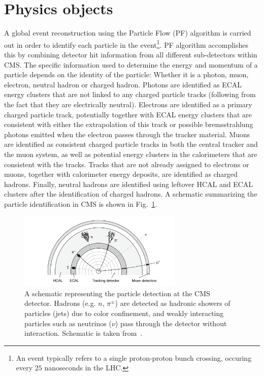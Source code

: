 \section{Physics objects} \label{sec:objects}

\newcommand{\GeV}{\ensuremath{GeV}\xspace}
\newcommand{\pt}{\ensuremath{p_T}\xspace}
\newcommand{\ptmiss}{\ensuremath{p_T^{miss}}\xspace}
\newcommand{\ptvecmiss}{\ensuremath{\vec{p}_{T}^{miss}}\xspace}

\graphicspath{{3_DataAnalysisStrategy/Figures}}

A global event reconstruction using the Particle Flow (PF) algorithm \cite{cms:particle_flow} is carried out in order to
identify each particle in the 
event\footnote{An event typically refers to a single proton-proton bunch crossing, occuring
every $25$ nanoseconds in the LHC.}. 
PF algorithm accomplishes this by combining detector hit information
from all different sub-detectors within CMS. The specific information used to determine the energy
and momentum of a particle depends on the identity of the particle: Whether it is a photon, muon, electron,
neutral hadron or charged hadron. Photons are identified as ECAL energy clusters that are not linked to 
any charged particle tracks (following from the fact that they are electrically neutral). 
Electrons are identified as a primary charged particle track, potentially 
together with ECAL energy clusters that are consistent with either the extrapolation of this track or possible
bremsstrahlung photons emitted when the electron passes through the tracker material. Muons are identified as 
consistent charged particle tracks in both the central tracker and the muon system, as well as potential energy
clusters in the calorimeters that are consistent with the tracks. Tracks that are not already assigned to electrons or muons,
together with calorimeter energy deposits, are identified as charged hadrons. Finally, neutral hadrons are identified using leftover 
HCAL and ECAL clusters after the identification of charged hadrons. A schematic summarizing the particle identification in CMS
is shown in Fig.~\ref{fig:particle_detection_cms}.

\begin{figure}[htbp]
    \centering
    \includegraphics[width=0.7\textwidth]{particle_detection_schematic.png}
    \caption{A schematic representing the particle detection at the CMS detector.
    Hadrons (e.g. $n$, $\pi^{\pm}$) are detected as hadronic showers of particles (jets)
    due to color confinement, and weakly interacting particles such as neutrinos ($\nu$) pass through the
    detector without interaction. Schematic is taken from~\cite{Thomson:2013zua}.}
    \label{fig:particle_detection_cms}
\end{figure}

